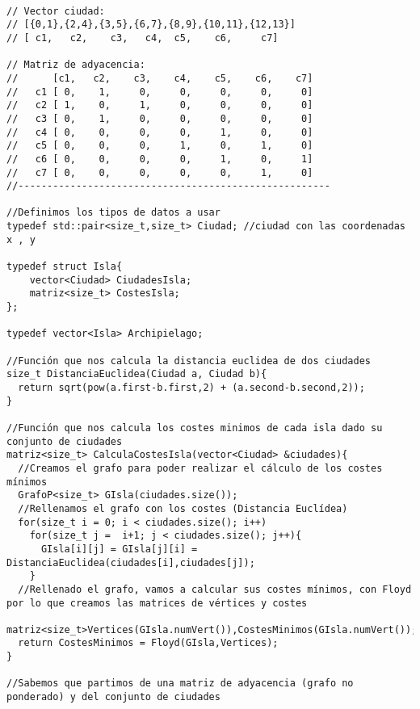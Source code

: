 \begin{verbatim}




// Vector ciudad: 
// [{0,1},{2,4},{3,5},{6,7},{8,9},{10,11},{12,13}]
// [ c1,   c2,    c3,   c4,  c5,    c6,     c7]

// Matriz de adyacencia:
//      [c1,   c2,    c3,    c4,    c5,    c6,    c7]
//   c1 [ 0,    1,     0,     0,     0,     0,     0]
//   c2 [ 1,    0,     1,     0,     0,     0,     0]
//   c3 [ 0,    1,     0,     0,     0,     0,     0]
//   c4 [ 0,    0,     0,     0,     1,     0,     0]
//   c5 [ 0,    0,     0,     1,     0,     1,     0]
//   c6 [ 0,    0,     0,     0,     1,     0,     1]
//   c7 [ 0,    0,     0,     0,     0,     1,     0]
//------------------------------------------------------

//Definimos los tipos de datos a usar
typedef std::pair<size_t,size_t> Ciudad; //ciudad con las coordenadas x , y

typedef struct Isla{
    vector<Ciudad> CiudadesIsla;
    matriz<size_t> CostesIsla;
};

typedef vector<Isla> Archipielago;

//Función que nos calcula la distancia euclidea de dos ciudades
size_t DistanciaEuclidea(Ciudad a, Ciudad b){
  return sqrt(pow(a.first-b.first,2) + (a.second-b.second,2));
}

//Función que nos calcula los costes minimos de cada isla dado su conjunto de ciudades
matriz<size_t> CalculaCostesIsla(vector<Ciudad> &ciudades){
  //Creamos el grafo para poder realizar el cálculo de los costes mínimos
  GrafoP<size_t> GIsla(ciudades.size());
  //Rellenamos el grafo con los costes (Distancia Euclídea)
  for(size_t i = 0; i < ciudades.size(); i++)
    for(size_t j =  i+1; j < ciudades.size(); j++){
      GIsla[i][j] = GIsla[j][i] = DistanciaEuclidea(ciudades[i],ciudades[j]);
    }
  //Rellenado el grafo, vamos a calcular sus costes mínimos, con Floyd por lo que creamos las matrices de vértices y costes
  matriz<size_t>Vertices(GIsla.numVert()),CostesMinimos(GIsla.numVert());
  return CostesMinimos = Floyd(GIsla,Vertices);
}

//Sabemos que partimos de una matriz de adyacencia (grafo no ponderado) y del conjunto de ciudades



\end{verbatim}
